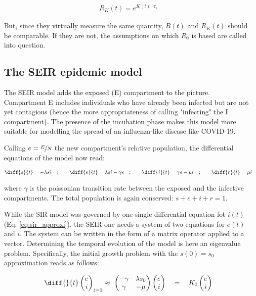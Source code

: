 \documentclass[DIV=12, BCOR=0pt]{scrartcl}  %
\begin{document}
  \begin{align}
  	R_K(t) = e^{K(t) \cdot \tau_s}
  	\label{eq:RKt}
  \end{align}

	But, since they virtually measure the same quantity, $R(t)$ and $R_K(t)$ should be comparable. If they are not, the assumptions on which $R_0$ is based are called into question.
  
  \subsection{The SEIR epidemic model}
  The SEIR model adds the exposed (E) compartment to the picture. Compartment E includes individuals who have already been infected but are not yet contagious (hence the more appropriateness of calling "infecting" the I compartment). The presence of the incubation phase makes this model more suitable for modelling the spread of an influenza-like disease like COVID-19. 
  
  Calling $e = \sfrac{E}{N}$ the new compartment's relative population, the differential equations of the model now read:
  
  \begin{align}
  	\diff{s}{t} = - \lambda s i \quad;  \qquad 	\diff{e}{t} = \lambda s i - \gamma e \quad; \qquad \diff{i}{t} = \gamma e - \mu i \quad; \qquad \diff{r}{t} = \mu i
  	\label{eq:seir}
  \end{align}

  where $\gamma$ is the poissonian transition rate between the exposed and the infective compartments. The total population is again conserved: $ s + e + i + r = 1$.
  
  While the SIR model was governed by one single differential equation fot $i(t)$ (Eq. \ref{eq:sir_approxi}), the SEIR one needs a system of two equations for $e(t)$ and $i$.
  The system can be written in the form of a matrix operator applied to a vector. Determining the temporal evolution of the model is here an eigenvalue problem. Specifically, the initial growth problem with the $s(0) = s_0$ approximation reads as follows: 
  
  \begin{align}
  	\diff{}{t}
  	\begin{pmatrix}
  			e \\
  			i
  	\end{pmatrix}_{t=0}
  	\approx \
  	\begin{pmatrix}
  		 - \gamma & \lambda s_0\\
  		 \gamma & - \mu
  	\end{pmatrix}
  	\begin{pmatrix}
  		e \\
  		i
  	\end{pmatrix}
	  \quad = \quad K_0 %
	  \begin{pmatrix}
	  	e \\
	  	i
	  \end{pmatrix} %
		\label{eq:seir_approxi}
	\end{align}
\end{document}
